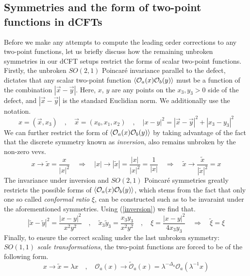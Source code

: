 \subsection{Symmetries and the form of two-point functions in dCFTs}\label{form of two-point functions in dCFT}
Before we make any attempts to compute the leading order corrections to any two-point functions, let us briefly discuss how the remaining unbroken symmetries in our dCFT setups restrict the forms of scalar two-point functions. Firstly, the unbroken $SO(2,1)$ Poincar\'e invariance parallel to the defect, dictates that any scalar two-point function $\expval{\mathcal{O}_a(x) \mathcal{O}_b(y)}$ must be a function of the combination $|\vec{x} - \vec{y}|$. Here, $x$, $y$ are any points on the $x_3,y_3 > 0$ side of the defect, and $|\vec{x} - \vec{y}|$ is the standard Euclidian norm. We additionally use the notation. 
%
%
\begin{equation}
x = (\vec{x}, x_3)
%
\quad , \quad
%
\vec{x} = (x_0, x_1, x_2)
%
\quad , \quad
%
|x-y|^2 = |\vec{x} -\vec{y}|^2 + |x_3 - y_3|^2
\end{equation}
%
%
We can further restrict the form of $\expval{\mathcal{O}_a(x) \mathcal{O}_b(y)}$ by taking advantage of the fact that the discrete symmetry known as \textit{inversion}, also remains unbroken by the non-zero vevs.
%
%
\begin{equation}\label{inversion}
x \to \tilde{x} = \frac{x}{|x|^2}
%
\quad \Rightarrow \quad
%
|x| \to |\tilde{x}| = \frac{|x|}{|x|^2} = \frac{1}{|x|}
%
\quad \Rightarrow \quad
%
\tilde{x} \to \frac{\tilde{x}}{|\tilde{x}|^2}
=
x
\end{equation}
%
%
The invariance under inversion and $SO(2,1)$ Poincar\'e symmetries greatly restricts the possible forms of $\expval{\mathcal{O}_a(x) \mathcal{O}_b(y)}$, which stems from the fact that only one so called \textit{conformal ratio} $\xi$, can be constructed such as to be invaraint under the aforementioned symmetries. Using (\ref{inversion}) we find that.
%
%
\begin{equation}\label{conformal_ratios}
|\tilde{x}-\tilde{y}|^2 = \frac{|x-y|^2}{x^2 y^2}
%
\quad , \quad
%
\tilde{x}_3 \tilde{y}_3 =\frac{x_3 y_3}{x^2 y^2}
%
\quad , \quad
%
\xi = \frac{|x-y|^2}{4 x_3 y_3}
%
\quad \Rightarrow \quad
%
\tilde{\xi} = \xi
\end{equation}
%
%
Finally, to ensure the correct scaling under the last unbroken symmetry: $SO(1,1)$ \textit{scale transformations}, the two-point functions are forced to be of the following form. 
%
%
\begin{equation}
x \to \tilde{x} = \lambda x
%
\quad , \quad
%
\mathcal{O}_a(x) \to \tilde{\mathcal{O}}_a(x)
=
\lambda^{-\Delta_a} \mathcal{O}_a(\lambda^{-1} x)
\end{equation}
